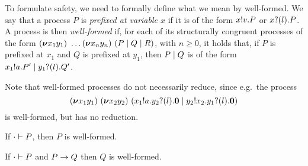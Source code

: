 



To formulate safety, we need to formally define what we mean by well-formed.
We say that a process \( P \) is \emph{prefixed at variable \( x \)} if it is of the form \( x ! v . P \) or \( x ? (l) . P \).
A process is then \emph{well-formed} if, for each of its structurally congruent processes of the form \( (\bm{\nu} x_1y_1)~\dots (\bm{\nu} x_ny_n)~(P \mid Q \mid R) \), with \( n \geq 0 \), it holds that, if \( P \) is prefixed at \( x_1 \) and \( Q \) is prefixed at \( y_1 \), then \( P \mid Q \) is of the form \( x_1 ! a . P' \mid y_1 ? (l) . Q' \).

Note that well-formed processes do not necessarily reduce, since e.g.\ the process
\begin{equation*}
  (\bm{\nu} x_1y_1)~(\bm{\nu} x_2y_2)~(x_1 ! a . y_2 ? (l) . \bm{0} \mid y_2 ! x_2 . y_1 ? (l) . \bm{0})
\end{equation*}
is well-formed, but has no reduction.


\begin{theorem}[Safety]
  If \( \cdot \vdash P \), then \( P \) is well-formed.
\end{theorem}

\begin{corollary}
  If \( \cdot \vdash P \) and \( P \rightarrow Q \) then \( Q \) is well-formed.
\end{corollary}